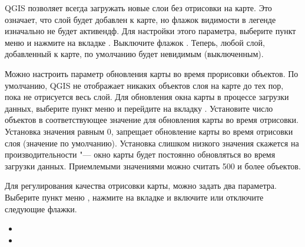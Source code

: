 \label{label_settinglayer}

QGIS позволяет всегда загружать новые слои без отрисовки на карте. Это
означает, что слой будет добавлен к карте, но
флажок видимости в легенде изначально не будет активендф. Для настройки
этого параметра, выберите пункт меню  \arrow
{} и нажмите на вкладке . Выключите
флажок . Теперь,
любой слой, добавленный к карте, по умолчанию будет невидимым (выключенным).

%
%

\label{label_updatemap}

Можно настроить параметр обновления карты во время прорисовки объектов.
По умолчанию, QGIS не отображает никаких объектов слоя на карте до тех пор,
пока не отрисуется весь слой. Для обновления окна карты в процессе загрузки данных,
выберите пункт меню  \arrow
{} и перейдите на вкладку . Установите
число объектов в соответствующее значение для обновления карты во время
отрисовки. Установка значения равным 0, запрещает обновление карты во время
отрисовки слоя (значение по умолчанию). Установка слишком низкого значения
скажется на производительности "--- окно карты будет постоянно обновляться
во время загрузки данных. Приемлемыми значениями можно считать 500 и более объектов.

\label{label_renderquality}

Для регулирования качества отрисовки карты, можно задать два параметра.
Выберите пункт меню  \arrow {},
нажмите на вкладке  и включите или отключите следующие флажки.

\begin{itemize}
\item {}
\item {}
\end{itemize}

